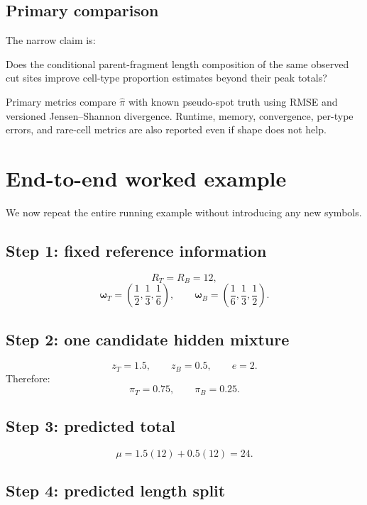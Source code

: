 \documentclass[11pt]{article}
\begin{document}
\subsection{Primary comparison}

The narrow claim is:

\begin{bigidea}
Does the conditional parent-fragment length composition of the same observed cut
sites improve cell-type proportion estimates beyond their peak totals?
\end{bigidea}

Primary metrics compare \(\widehat\pi\) with known pseudo-spot truth using RMSE and
versioned Jensen--Shannon divergence. Runtime, memory, convergence, per-type
errors, and rare-cell metrics are also reported even if shape does not help.

\section{End-to-end worked example}

We now repeat the entire running example without introducing any new symbols.

\subsection{Step 1: fixed reference information}

\[
R_T=R_B=12,
\]
\[
\boldsymbol\omega_T=
\left(\frac12,\frac13,\frac16\right),
\qquad
\boldsymbol\omega_B=
\left(\frac16,\frac13,\frac12\right).
\]

\subsection{Step 2: one candidate hidden mixture}

\[
z_T=1.5,\qquad z_B=0.5,\qquad e=2.
\]
Therefore:
\[
\pi_T=0.75,\qquad\pi_B=0.25.
\]

\subsection{Step 3: predicted total}

\[
\mu=1.5(12)+0.5(12)=24.
\]

\subsection{Step 4: predicted length split}
\end{document}
